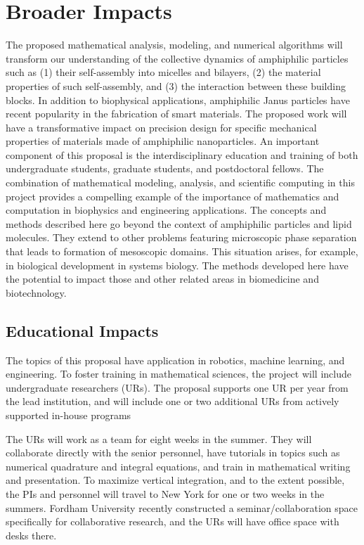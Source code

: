 \section{Broader Impacts}
\label{sec:BroaderImpacts}

The proposed mathematical analysis, modeling, and numerical algorithms
will transform our understanding of the collective dynamics of
amphiphilic particles such as (1) their self-assembly into micelles and
bilayers, (2) the material properties of such self-assembly, and (3) the
interaction between these building blocks. In addition to biophysical
applications, amphiphilic Janus particles have recent popularity in the
fabrication of smart materials. The proposed work will have a
transformative impact on precision design for specific mechanical
properties of materials made of amphiphilic nanoparticles. An important
component of this proposal is the interdisciplinary education and
training of both undergraduate students, graduate students, and
postdoctoral fellows. The combination of mathematical modeling,
analysis, and scientific computing in this project provides a compelling
example of the importance of mathematics and computation in biophysics
and engineering applications. The concepts and methods described here go
beyond the context of amphiphilic particles and lipid molecules. They
extend to other problems featuring microscopic phase separation that
leads to formation of mesoscopic domains. This situation arises, for
example, in biological development in systems biology. The methods
developed here have the potential to impact those and other related
areas in biomedicine and biotechnology.

\subsection{Educational Impacts}
\label{subsec:Educational_plans}
The topics of this proposal have application in robotics, machine
learning, and engineering. To foster training in mathematical sciences,
the project will include undergraduate researchers (URs). The proposal
supports one UR per year from the lead institution, and will include one
or two additional URs from actively supported in-house programs

The URs will work as a team for eight weeks in the summer. They will
collaborate directly with the senior personnel, have tutorials in topics
such as numerical quadrature and integral equations, and train in
mathematical writing and presentation. To maximize vertical integration,
and to the extent possible, the PIs and personnel will travel to New
York for one or two weeks in the summers. Fordham University recently
constructed a seminar/collaboration space specifically for collaborative
research, and the URs will have office space with desks there.

